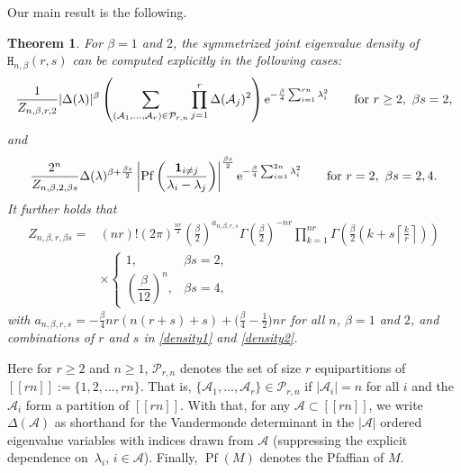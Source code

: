 \documentclass[pdftex]{sigma}
\numberwithin{equation}{section}
\newtheorem{Theorem}{Theorem}[section]
\theoremstyle{definition}
\newcommand{\cP}{{\mathcal P}}
\newcommand{\Pf}{\operatorname{Pf}}
\newcommand{\cA}{\mathcal{A}}
\newcommand{\lst}[1]{[\![#1 ]\!]}
\newcommand{\HH}{\mathtt{H}_{n,\beta}}
\begin{document}
Our main result is the following.

\begin{Theorem}\label{thm:main}
For $\beta =1$ and $2$, the symmetrized joint eigenvalue density of $\HH(r,s)$ can be computed explicitly in the following cases:
 \begin{align}
 \frac{1}{Z_{n, \beta, r, 2}} |\Delta({\lambda})|^{\beta}
 \left( \sum_{(\mathcal{A}_1,\dots,\mathcal{A}_r)\in \cP_{r,n}} \prod_{j=1}^r \Delta(\cA_j)^2 \right) {\rm e}^{- \frac{\beta}{4}\sum_{i=1}^{rn} \lambda_i^2} \qquad
 \mbox{for}\ r \ge 2, \ \beta s=2, \label{density1}
 \end{align}
and
 \begin{align}
 \label{density2}
 \frac{2^n}{Z_{n, \beta, 2, \beta s}} \Delta({\lambda})^{\beta+\frac{\beta s}{2}} \left|\Pf \left(\frac{{\bf{1}}_{i \neq j}}{\lambda_i -\lambda_j} \right)\right|^{\frac{\beta s}{2}} {\rm e}^{- \frac{\beta}{4}\sum_{i=1}^{2n}\lambda_i^2} \qquad \mbox{for} \ r = 2, \ \beta s = 2,4.
 \end{align}
It further holds that
\begin{align*}
Z_{n, \beta, r, \beta s} ={}&(n r)! (2\pi)^{\frac{nr}{2}}
\left(\frac{\beta}{2}\right)^{a_{n,\beta,r,s}} \Gamma\left(\frac{\beta}{2}\right)^{-nr} \prod_{k=1}^{nr} \Gamma\left(\frac{\beta}{2}\left(k+s \left\lceil\frac{k}{r}\right\rceil\right)\right)\\
& \times \begin{cases}
 1, &\beta s=2,\\
 \left(\dfrac{\beta}{12}\right)^n, &\beta s=4,
\end{cases}
\end{align*}
with $a_{n,\beta,r,s}=
-\frac{\beta}{4} n r (n (r+s)+s)+\bigl(\frac{\beta}{4}-\frac{1}{2}\bigr){nr}$
for all $n$, $\beta = 1$ and $2$, and combinations of $r$ and $s$ in \eqref{density1} and \eqref{density2}.
\end{Theorem}
Here
for $r\ge 2$ and $n\ge 1$, $\cP_{r,n}$ denotes the set of size $r$ equipartitions of $\lst{rn} := \{ 1,2, \dots, rn\}$.
That is, $\{\cA_1, \dots,\cA_r\}\in \cP_{r,n}$ if $|\cA_i|=n$ for all $i$ and the $\cA_i$ form a partition of $\lst{rn}$. With that, for any
 $\cA \subset \lst{rn}$, we write $\Delta(\cA)$ as shorthand for the Vandermonde determinant in the $|\cA|$ ordered eigenvalue variables with indices drawn from $\cA$ (suppressing the explicit dependence on~$\lambda_i$, $i \in \cA$). Finally,
$\Pf(M)$ denotes the Pfaffian of $M$.
\end{document}
